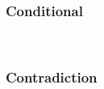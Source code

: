 \vspace{-10pt}
\hrulefill
\vspace{-10pt}
\begin{multicols}{2}
\subsubsection*{Conditional}

\begin{pf}
	\open
		\ellipsesline
	\close
\end{pf}

\vfill\null
\columnbreak

\begin{pf}
\\	
	 
\end{pf}
\end{multicols} %

\vspace{-10pt}
\hrulefill
\vspace{-10pt}
\begin{multicols}{2}
\subsubsection*{Contradiction}

\begin{pf}
\end{pf}

\vfill\null
\columnbreak

\begin{pf}

\\\have[ ]{}{\metaX}
\end{pf}
\end{multicols} %

